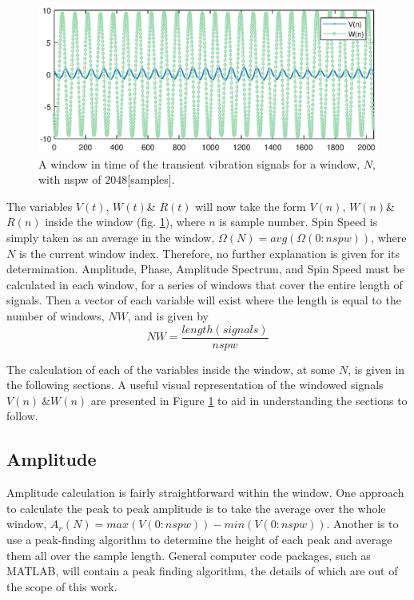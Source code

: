 \begin{figure}
	\centering
	\includegraphics{./figures/SSTime.eps}
	\caption{A window in time of the transient vibration signals for a window, $ N $, with nspw of $ 2048 $[samples].}
	\label{fig:WindowedData}
\end{figure}
The variables $ V(t) $, $ W(t) $\& $ R(t) $ will now take the form $ V(n) $, $ W(n) $\& $ R(n) $ inside the window (fig. \ref{fig:WindowedData}), where $ n $ is sample number. Spin Speed is simply taken as an average in the window, $ \Omega(N)=avg(\Omega(0:nspw)) $, where $ N $ is the current window index. Therefore, no further explanation is given for its determination. Amplitude, Phase, Amplitude Spectrum, and Spin Speed must be calculated in each window, for a series of windows that cover the entire length of signals. Then a vector of each variable will exist where the length is equal to the number of windows, $ NW $, and is given by
\begin{equation*}
NW = \frac{length(signals)}{nspw}
\end{equation*}\par 
The calculation of each of the variables inside the window, at some $ N $, is given in the following sections. A useful visual representation of the windowed signals $ V(n)\ \& W(n) $ are presented in Figure \ref{fig:WindowedData} to aid in understanding the sections to follow.
\subsection{Amplitude}
Amplitude calculation is fairly straightforward within the window. One approach to calculate the peak to peak amplitude is to take the average over the whole window, $ A_v(N) = max(V(0:nspw))-min(V(0:nspw)) $. Another is to use a peak-finding algorithm to determine the height of each peak and average them all over the sample length. General computer code packages, such as MATLAB,  will contain a peak finding algorithm, the details of which are out of the scope of this work.
